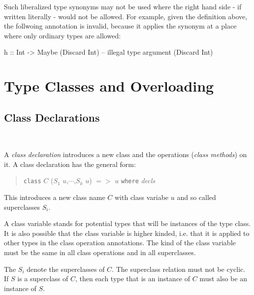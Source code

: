 Such liberalized type synonyms may not be used where the right hand side - if written literally - would not be allowed. For example, given the definition above, the follwoing annotation is invalid, because it applies the synonym at a place where only ordinary types are allowed:

\begin{code}
h :: Int -> Maybe (Discard Int)    -- illegal type argument (Discard Int)
\end{code}



\section{Type Classes and Overloading}
\subsection{Class Declarations} \label{classdcl}  

\begin{flushleft}
     \\
  
\end{flushleft}

A \emph{class declaration} introduces a new class and the operations (\emph{class methods}) on it. A class declaration has the general form:

\begin{quote}
\texttt{class} $C$ \hspace{0.2cm} ($S_1$ $u$,$\cdots$,$S_k$ $u$)  $=>$ $u$\hspace{0.2cm} \texttt{where} \hspace{0.2cm} \emph{decls}
\end{quote}

This introduces a new class name $C$ with class variabe $u$ and so called superclasses $S_i$.

A class variable stands for potential types that will be instances of the type class. It is also possible that the class variable is higher kinded, i.e. that it is applied to other types in the class operation annotations. The kind of the class variable must be the same in all class operations and in all superclasses.

The $S_i$ denote the superclasses of $C$.
The superclass relation must not be cyclic. If $S$ is a superclass of $C$, then each type that is an instance of $C$ must also be an instance of $S$.

